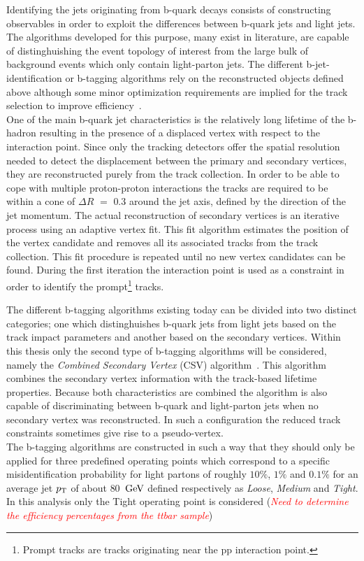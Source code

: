 Identifying the jets originating from b-quark decays consists of constructing observables in order to exploit the differences between b-quark jets and light jets. The algorithms developed for this purpose, many exist in literature, are capable of distinghuishing the event topology of interest from the large bulk of background events which only contain light-parton jets.
The different b-jet-identification or b-tagging algorithms rely on the reconstructed objects defined above although some minor optimization requirements are implied for the track selection to improve efficiency~\cite{}.
\\
One of the main b-quark jet characteristics is the relatively long lifetime of the b-hadron resulting in the presence of a displaced vertex with respect to the interaction point. Since only the tracking detectors offer the spatial resolution needed to detect the displacement between the primary and secondary vertices, they are reconstructed purely from the track collection. In order to be able to cope with multiple proton-proton interactions the tracks are required to be within a cone of $\Delta R$ $=$ $0.3$ around the jet axis, defined by the direction of the jet momentum. 
The actual reconstruction of secondary vertices is an iterative process using an adaptive vertex fit. This fit algorithm estimates the position of the vertex candidate and removes all its associated tracks from the track collection. This fit procedure is repeated until no new vertex candidates can be found. During the first iteration the interaction point is used as a constraint in order to identify the prompt\footnote{Prompt tracks are tracks originating near the pp interaction point.} tracks.

The different b-tagging algorithms existing today can be divided into two distinct categories; one which distinghuishes b-quark jets from light jets based on the track impact parameters and another based on the secondary vertices. Within this thesis only the second type of b-tagging algorithms will be considered, namely the \textit{Combined Secondary Vertex} (CSV) algorithm~\cite{}. This algorithm combines the secondary vertex information with the track-based lifetime properties. Because both characteristics are combined the algorithm is also capable of discriminating between b-quark and light-parton jets when no secondary vertex was reconstructed. In such a configuration the reduced track constraints sometimes give rise to a pseudo-vertex.
\\
The b-tagging algorithms are constructed in such a way that they should only be applied for three predefined operating points which correspond to a specific misidentification probability for light partons of roughly $10 \%$, $1 \%$ and $0.1 \%$ for an average jet $p_{\rm T}$ of about $80$ $\, \mathrm{GeV}$ defined respectively as \textit{Loose}, \textit{Medium} and \textit{Tight}. In this analysis only the Tight operating point is considered (\textit{\textcolor{red}{Need to determine the efficiency percentages from the ttbar sample}})

